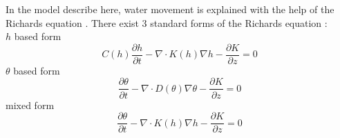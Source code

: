 In the model describe here, water movement is explained with the help of the Richards equation \parencite{richards_capillary_1931}.  There exist 3 standard forms of the Richards equation \parencite{celia_general_1990}:  \\
$h$ based form
\begin{equation}
  \label{eq:h_based_richeq}
  C(h) \frac{\partial h}{\partial t} - \nabla \cdot K(h)\nabla h - \frac{\partial K}{\partial z} = 0
\end{equation}
$\theta$ based form
\begin{equation}
  \label{eq:theta_base_richeq}
  \frac{\partial \theta}{\partial t} - \nabla \cdot D(\theta)\nabla \theta - \frac{\partial K}{\partial z} = 0
\end{equation}
mixed form
\begin{equation}
  \label{eq:mixed_richeq}
  \frac{\partial \theta}{\partial t} - \nabla \cdot K(h)\nabla h - \frac{\partial K}{\partial z} = 0
\end{equation}
